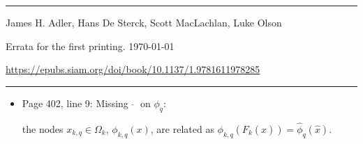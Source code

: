 \documentclass[mytheorems]{SIAMbook2019}
\newcommand{\erratafix}[1]{\medskip\newline\colorbox{latexgray}{\begin{minipage}[t]{0.80\textwidth}#1\end{minipage}}}
\begin{document}
\thispagestyle{empty}
\par\noindent\hfill\rule{\textwidth}{0.5pt}

\medskip
{}\newline
\noindent James H. Adler, Hans De Sterck, Scott MacLachlan, Luke Olson
\medskip

\noindent Errata for the first printing. \today

\medskip
\noindent \url{https://epubs.siam.org/doi/book/10.1137/1.9781611978285}

\par\noindent\hfill\rule{\textwidth}{0.5pt}

\medskip

\begin{itemize}
  \item  \textcolor{tab-red}{Page 402, line 9:} Missing $\;\widehat{}\;$ on $\phi_q$:
    \erratafix{
    the nodes $x_{k,q}\in\Omega_k$, $\phi_{k,q}(x)$, are related as $\phi_{k,q}(F_k(\widehat{x})) = \widehat{\phi}_q(\widehat{x})$.
  }
\end{itemize}
\end{document}
